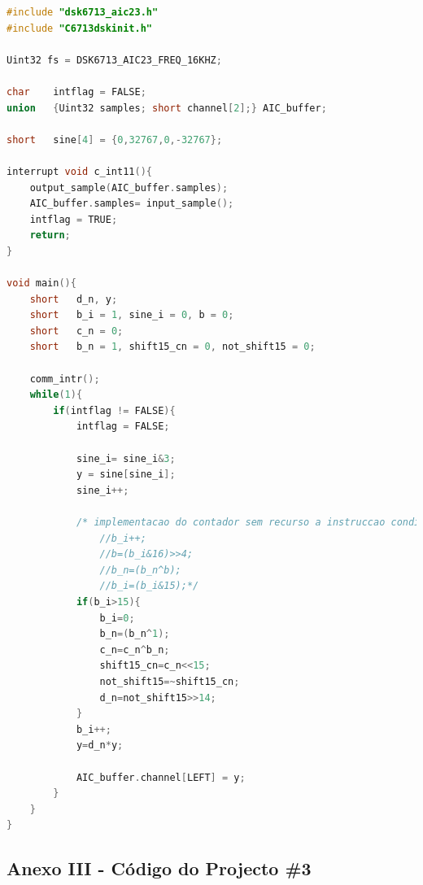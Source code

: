 \documentclass[11pt]{article}
\numberwithin{equation}{section}
\begin{document}
\begin{lstlisting}[language=C]
#include "dsk6713_aic23.h"	
#include "C6713dskinit.h"

Uint32 fs = DSK6713_AIC23_FREQ_16KHZ;	

char	intflag = FALSE;
union	{Uint32 samples; short channel[2];} AIC_buffer;

short	sine[4] = {0,32767,0,-32767};

interrupt void c_int11(){
	output_sample(AIC_buffer.samples);   	
	AIC_buffer.samples= input_sample(); 	    
	intflag = TRUE;
	return;
}

void main(){
	short	d_n, y;
	short	b_i = 1, sine_i = 0, b = 0;
	short	c_n = 0;
	short	b_n = 1, shift15_cn = 0, not_shift15 = 0;
	
	comm_intr();
	while(1){
		if(intflag != FALSE){
			intflag = FALSE;
			
			sine_i= sine_i&3;
			y = sine[sine_i];
			sine_i++;
			
			/* implementacao do contador sem recurso a instruccao condicional if */
				//b_i++;
				//b=(b_i&16)>>4;
				//b_n=(b_n^b);
				//b_i=(b_i&15);*/
			if(b_i>15){
				b_i=0;
				b_n=(b_n^1);
				c_n=c_n^b_n;
				shift15_cn=c_n<<15;
				not_shift15=~shift15_cn;
				d_n=not_shift15>>14;				
			}
			b_i++;
			y=d_n*y;
			
			AIC_buffer.channel[LEFT] = y;
		}
	}
}
\end{lstlisting}

\subsection{Anexo III - Código do Projecto \#3}
\end{document}
